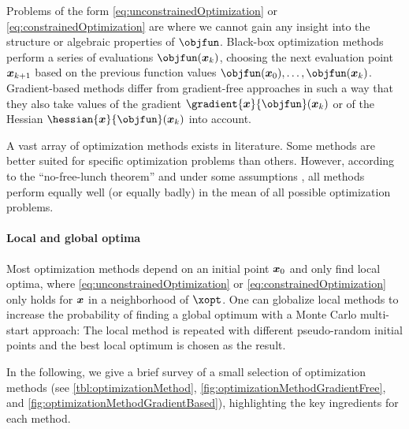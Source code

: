 Problems of the form \eqref{eq:unconstrainedOptimization} or
\eqref{eq:constrainedOptimization} are 
where we cannot gain any insight into the structure or algebraic
properties of $\objfun$.
Black-box optimization methods perform a series of evaluations
$\objfun(\*x_k)$,
choosing the next evaluation point ${\boldsymbol{x}}_{k+1}$
based on the previous function values $\objfun(\*x_0), \dotsc, \objfun(\*x_k)$.
Gradient-based methods differ from gradient-free approaches
in such a way that they also take values of the gradient
$\gradient{\*x}{\objfun}(\*x_k)$ or of the Hessian
$\hessian{\*x}{\objfun}(\*x_k)$ into account.

A vast array of optimization methods exists in literature.
Some methods are better suited for specific optimization problems
than others.
However, according to the ``no-free-lunch theorem''
and under some assumptions \cite{Wolpert97No},
all methods perform equally well (or equally badly) in the mean of all possible
optimization problems.

\paragraph{Local and global optima}

Most optimization methods depend on an initial point ${\boldsymbol{x}}_0$ and
only find local optima,
where \eqref{eq:unconstrainedOptimization} or
\eqref{eq:constrainedOptimization} only holds for ${\boldsymbol{x}}$
in a neighborhood of $\xopt$.
One can globalize local methods to increase the probability
of finding a global optimum with a Monte Carlo multi-start approach:
The local method is repeated with different pseudo-random initial points
and the best local optimum is chosen as the result.

In the following,
we give a brief survey of a small selection of optimization methods
(see
\cref{tbl:optimizationMethod},
\cref{fig:optimizationMethodGradientFree}, and
\cref{fig:optimizationMethodGradientBased}),
highlighting the key ingredients for each method.

